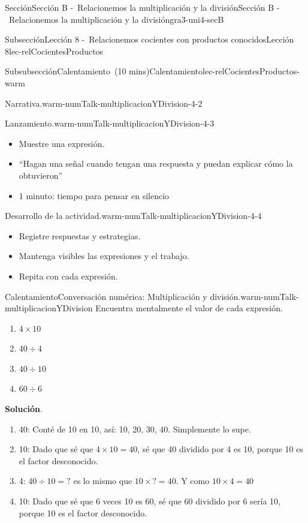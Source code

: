 \documentclass[oneside,10pt,]{article}
\newcommand{\blocktitlefont}{\relax}
\begin{document}
\begin{sectionptx}{Sección}{Sección B -~Relacionemos la multiplicación y la división}{}{Sección B -~Relacionemos la multiplicación y la división}{}{}{gra3-uni4-secB}
\begin{subsectionptx}{Subsección}{Lección 8 -~Relacionemos cocientes con productos conocidos}{}{Lección 8}{}{}{lec-relCocientesProductos}
\begin{subsubsectionptx}{Subsubsección}{Calentamiento~(10 mins)}{}{Calentamiento}{}{}{lec-relCocientesProductos-warm}
\begin{paragraphs}{Narrativa.}{warm-numTalk-multiplicacionYDivision-4-2}
\end{paragraphs}%
\begin{paragraphs}{Lanzamiento.}{warm-numTalk-multiplicacionYDivision-4-3}%
%
\begin{itemize}[label=\textbullet]
\item{}Muestre una expresión.%
\item{}``Hagan una señal cuando tengan una respuesta y puedan explicar cómo la obtuvieron''%
\item{}1 minuto: tiempo para pensar en silencio%
\end{itemize}
\end{paragraphs}%
\begin{paragraphs}{Desarrollo de la actividad.}{warm-numTalk-multiplicacionYDivision-4-4}%
%
\begin{itemize}[label=\textbullet]
\item{}Registre respuestas y estrategias.%
\item{}Mantenga visibles las expresiones y el trabajo.%
\item{}Repita con cada expresión.%
\end{itemize}
\end{paragraphs}%
\begin{exploration}{Calentamiento}{Conversación numérica: Multiplicación y división.}{warm-numTalk-multiplicacionYDivision}%
Encuentra mentalmente el valor de cada expresión.%
%
\begin{enumerate}[label={\Alph*.}]
\item{}\(\displaystyle 4\times 10\)%
\item{}\(\displaystyle 40\div 4\)%
\item{}\(\displaystyle 40\div 10\)%
\item{}\(\displaystyle 60\div 6\)%
\end{enumerate}
\par\smallskip%
\noindent\textbf{\blocktitlefont Solución}.\hypertarget{warm-numTalk-multiplicacionYDivision-3}{}\quad{}%
\begin{enumerate}[label={\Alph*.}]
\item{}40: Conté de 10 en 10, así: 10, 20, 30, 40. Simplemente lo supe.%
\item{}10: Dado que sé que \(4 \times 10 = 40\), sé que 40 dividido por 4 es 10, porque 10 es el factor desconocido.%
\item{}4: \(40 \div 10 = {?} \) es lo mismo que  \(10 \times {?} = 40\). Y como \(10 \times 4 = 40\)%
\item{}10: Dado que sé que 6 veces 10 es 60, sé que 60 dividido por 6 sería 10, porque 10 es el factor desconocido.%

\end{enumerate}
\end{exploration}
\end{subsubsectionptx}
\end{subsectionptx}
\end{sectionptx}
\end{document}
